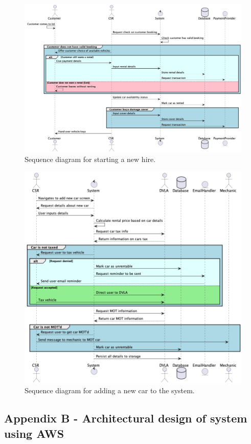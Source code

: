   \begin{figure}[H]
    \centering
    \includegraphics[width=12cm]{assets/Sequence4.png}
    \caption{Sequence diagram for starting a new hire.}
    \label{fig:startHireSequence}
  \end{figure}

  \begin{figure}[H]
    \centering
    \includegraphics[width=12cm]{assets/Sequence5.png}
    \caption{Sequence diagram for adding a new car to the system.}
    \label{fig:newCarSequence}
  \end{figure}

\subsection{Appendix B - Architectural design of system using AWS}
\label{sec:AppendixB}

